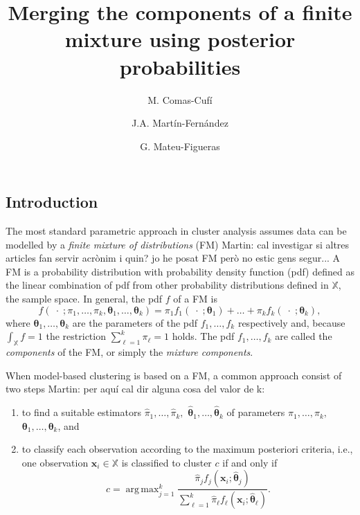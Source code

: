 \documentclass[10pt, a4paper]{article}
\title{Merging the components of a finite mixture using  posterior probabilities}
\author{M. Comas-Cufí \and J.A. Martín-Fernández \and G. Mateu-Figueras}
\DeclareMathOperator*{\argmax}{arg\,max}
\newcommand{\m}[1]{\boldsymbol{#1}}
\begin{document}
\begin{spacing}{1.9}


\maketitle

\section{Introduction}

The most standard parametric approach in cluster analysis assumes data can be modelled by a \emph{finite mixture of distributions} (FM){\color{blue} Martin: cal investigar si altres articles fan servir acrònim i quin? jo he posat FM però no estic gens segur..}. A FM is a probability distribution with probability density function (pdf) defined as the linear combination of pdf from other probability distributions defined in $\mathbb{X}$, the sample space. In general, the pdf $f$ of a FM is
\begin{equation}\label{mixt}
f(\;\cdot\; ; \pi_1, \dots, \pi_k, \m\theta_1, \dots, \m\theta_k) = \pi_1 f_1(\;\cdot\; ; \m\theta_1) + \dots + \pi_k f_k(\;\cdot\; ; \m\theta_k),
\end{equation}
where $\m\theta_1, \dots,  \m\theta_k$ are the parameters of the pdf $f_1, \dots, f_k$ respectively and, because $\int_{\mathbb{X}}f = 1$ the restriction $\sum_{\ell = 1}^k \pi_\ell = 1$ holds. The pdf $f_1, \dots, f_k$ are called the \emph{components} of the FM, or simply the \emph{mixture components}.


When model-based clustering is based on a FM, a common approach consist of two steps {\color{blue} Martin: per aquí cal dir alguna cosa del valor de k}:
\begin{enumerate}
\item to find a suitable estimators $\hat{\pi}_1, \dots, \hat{\pi}_k,$ $\hat{\m\theta}_1, \dots, \hat{\m\theta}_k$ of parameters $\pi_1, \dots, \pi_k,$ $\m\theta_1, \dots, \m\theta_k$, and
\item to classify each observation according to the maximum posteriori criteria, i.e., one observation $\m x_i \in \mathbb{X}$ is classified to cluster $c$ if and only if
\[
c=\argmax_{j=1}^k \frac{ \hat{\pi}_j f_j(\m x_i ; \hat{\m\theta}_j) }{\sum_{\ell=1}^k \hat{\pi}_\ell f_\ell(\m x_i ; \hat{\m\theta}_\ell) }.
\]
\end{enumerate}



\end{spacing}
\end{document}
